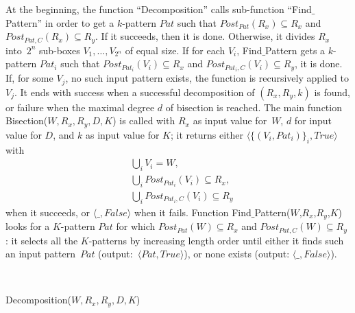 At the beginning,
the function ``Decomposition'' calls sub-function ``Find\-$\_$\-Patt\-ern'' in order
to get a $k$-pattern $Pat$ such that $Post_{Pat}(R_x)\subseteq R_x$
 and $Post_{Pat,C}(R_x)\subseteq R_y$. %
If it succeeds, then it is done.
Otherwise, it divides $R_x$ 
into~$2^n$ 
sub-boxes $V_1,\dots,V_{2^n}$ of equal size.
If for each $V_i$, Find$\_$\-Pattern 
gets a $k$-pattern $Pat_i$ such that $Post_{Pat_i}(V_i)\subseteq R_x$ and $Post_{Pat_i,C}(V_i)\subseteq R_y$, %
it is done.
If, for some $V_j$, no such input pattern exists,
the function is recursively applied to $V_j$.
It ends with success when a successful decomposition 
of $(R_x,R_y,k)$ is found,
or failure when
the maximal degree $d$ of bisection is reached.
The main function  %
Bisection($W,R_x,R_y,D,K$)
is called with $R_x$ as input value for~$W$, $d$
for input value for $D$, and $k$ as input value for $K$;
it returns either $\langle\{(V_i,Pat_i)\}_{i},True\rangle$ with 
\[\begin{aligned} &\bigcup_i V_i=W, \\
&\bigcup_i Post_{Pat_i}(V_i)\subseteq R_x,\\ &\bigcup_i Post_{Pat_i,C}(V_i)\subseteq R_y \end{aligned}\] when it succeeds,
or $\langle\_ ,False\rangle$ when it fails.
Function Find$\_$Pattern($W$,$R_x$,$R_y$,$K$) looks
for a $K$-pattern  $Pat$ for which
$Post_{Pat}(W)\subseteq R_x$ and $Post_{Pat,C}(W)\subseteq R_y$ :
it  selects all the $K$-patterns 
by increasing length order
until either it finds such an input pattern~$Pat$ 
(output:~$\langle Pat, True\rangle$), or
none exists
(output: $\langle\_, False\rangle$).

\begin{algorithm}[ht]
\centering
\begin{algorithmic}
  \\
\ENDIF

\caption{\small Decomposition($W,R_x,R_y,D,K$) 
}  
\label{alg:decompo_part5}  

\end{algorithmic}
\end{algorithm}





